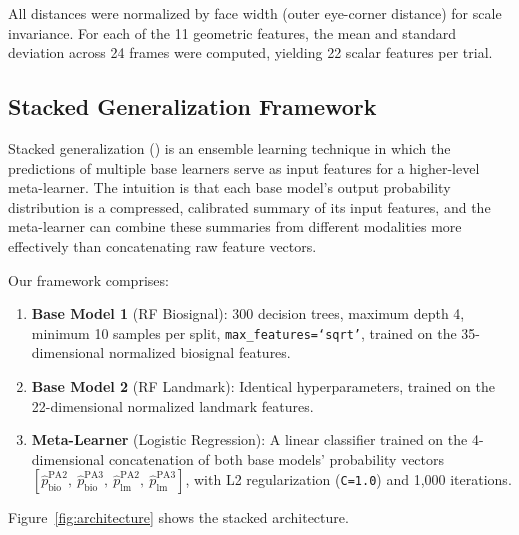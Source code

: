 \documentclass[10pt, twocolumn]{article}
\begin{document}
All distances were normalized by face width (outer eye-corner distance) for scale
invariance. For each of the 11 geometric features, the mean and standard deviation across
24 frames were computed, yielding 22 scalar features per trial.

\subsection{Stacked Generalization Framework}
\label{sec:stacking}

Stacked generalization (\cite{Wolpert1992}) is an ensemble learning technique in which the
predictions of multiple base learners serve as input features for a higher-level
meta-learner. The intuition is that each base model's output probability distribution is a
compressed, calibrated summary of its input features, and the meta-learner can combine
these summaries from different modalities more effectively than concatenating raw feature
vectors.

Our framework comprises:

\begin{enumerate}
  \item \textbf{Base Model 1} (RF Biosignal): 300 decision trees, maximum depth 4,
        minimum 10 samples per split, \texttt{max\_features=`sqrt'}, trained on the
        35-dimensional normalized biosignal features.
  \item \textbf{Base Model 2} (RF Landmark): Identical hyperparameters, trained on the
        22-dimensional normalized landmark features.
  \item \textbf{Meta-Learner} (Logistic Regression): A linear classifier trained on the
        4-dimensional concatenation of both base models' probability vectors
        $[\hat{p}_{\text{bio}}^{\text{PA2}},\ \hat{p}_{\text{bio}}^{\text{PA3}},\
          \hat{p}_{\text{lm}}^{\text{PA2}},\ \hat{p}_{\text{lm}}^{\text{PA3}}]$,
        with L2 regularization (\texttt{C=1.0}) and 1,000 iterations.
\end{enumerate}

Figure~\ref{fig:architecture} shows the stacked architecture.
\end{document}
